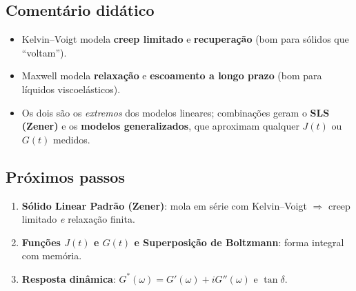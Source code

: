 \subsection{Comentário didático}
\begin{itemize}
  \item Kelvin--Voigt modela \textbf{creep limitado} e \textbf{recuperação} (bom para sólidos que “voltam”).
  \item Maxwell modela \textbf{relaxação} e \textbf{escoamento a longo prazo} (bom para líquidos viscoelásticos).
  \item Os dois são os \emph{extremos} dos modelos lineares; combinações geram o \textbf{SLS (Zener)} e os \textbf{modelos generalizados}, que aproximam qualquer $J(t)$ ou $G(t)$ medidos.
\end{itemize}

\subsection{Próximos passos}
\begin{enumerate}
  \item \textbf{Sólido Linear Padrão (Zener)}: mola em série com Kelvin--Voigt \(\Rightarrow\) creep limitado \emph{e} relaxação finita.
  \item \textbf{Funções $J(t)$ e $G(t)$ e Superposição de Boltzmann}: forma integral com memória.
  \item \textbf{Resposta dinâmica}: \(G^*(\omega)=G'(\omega)+iG''(\omega)\) e \(\tan\delta\).
\end{enumerate}
